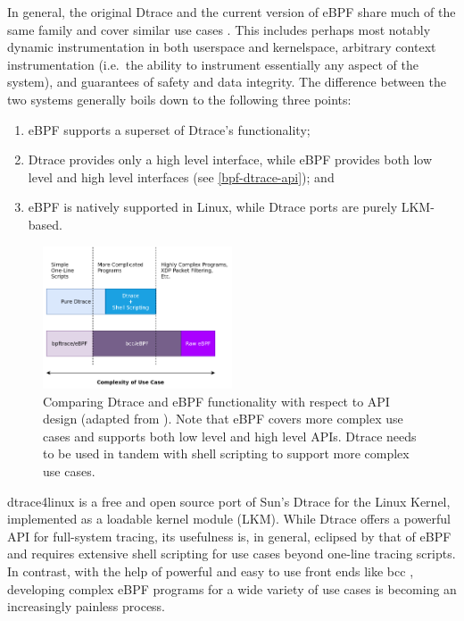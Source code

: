 \documentclass[
  12pt]{findlay}
\providecommand{\tightlist}{%
  \setlength{\itemsep}{0pt}\setlength{\parskip}{0pt}}
\begin{document}
In general, the original Dtrace and the current version of eBPF share
much of the same family and cover similar use cases
\autocite{cantrill04,starovoitov13}. This includes perhaps most notably
dynamic instrumentation in both userspace and kernelspace, arbitrary
context instrumentation (i.e.~the ability to instrument essentially any
aspect of the system), and guarantees of safety and data integrity. The
difference between the two systems generally boils down to the following
three points:

\begin{enumerate}
\def\labelenumi{(\arabic{enumi})}
\tightlist
\item
  eBPF supports a superset of Dtrace's functionality;
\item
  Dtrace provides only a high level interface, while eBPF provides both
  low level and high level interfaces (see \autoref{bpf-dtrace-api});
  and
\item
  eBPF is natively supported in Linux, while Dtrace ports are purely
  LKM-based.
\end{enumerate}

\begin{figure}
\includegraphics[width=0.5\textwidth]{../figures/bpf-dtrace-api.png}
\caption[Comparing Dtrace and eBPF functionality with respect to API design]
{
Comparing Dtrace and eBPF functionality with respect to API design (adapted from \cite{gregg18}).
Note that eBPF covers more complex use cases and supports both low level
and high level APIs. Dtrace needs to be used in tandem with shell
scripting to support more complex use cases.
}
\label{bpf-dtrace-api}
\end{figure}

dtrace4linux \autocite{dtrace4linux} is a free and open source port of
Sun's Dtrace \autocite{cantrill04} for the Linux Kernel, implemented as
a loadable kernel module (LKM). While Dtrace offers a powerful API for
full-system tracing, its usefulness is, in general, eclipsed by that of
eBPF \autocite{gregg18} and requires extensive shell scripting for use
cases beyond one-line tracing scripts. In contrast, with the help of
powerful and easy to use front ends like bcc \autocite{bcc}, developing
complex eBPF programs for a wide variety of use cases is becoming an
increasingly painless process.
\end{document}
